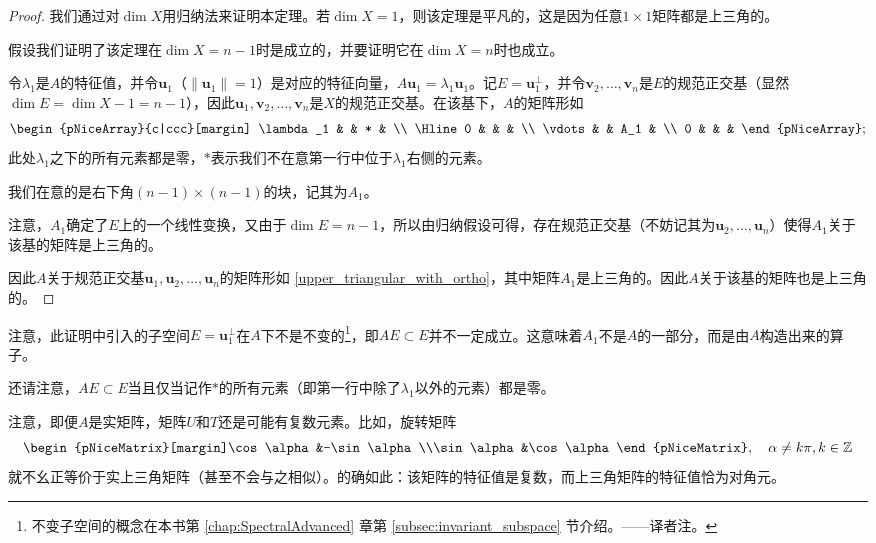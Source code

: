 \begin{proof}
    我们通过对$\dim X$用归纳法来证明本定理。若$\dim X=1$，则该定理是平凡的，这是因为任意$1\times 1$矩阵都是上三角的。

    假设我们证明了该定理在$\dim X=n-1$时是成立的，并要证明它在$\dim X=n$时也成立。

    令$\lambda_1$是$A$的特征值，并令$\mathbf{u}_1$（$\|\mathbf{u}_1\|=1$）是对应的特征向量，$A\mathbf{u}_1=\lambda_1\mathbf{u}_1$。记$E=\mathbf{u}_1^\perp$，并令$\mathbf{v}_{2},\ldots,\mathbf{v}_{n}$是$E$的规范正交基（显然$\dim E=\dim X-1=n-1$），因此$\mathbf{u}_1,\mathbf{v}_{2},\ldots,\mathbf{v}_{n}$是$X$的规范正交基。在该基下，$A$的矩阵形如
    \begin{equation}\label{upper_triangular_with_ortho}
        \begin{pNiceArray}{c|ccc}[margin]
            \lambda_1 & & * & \\
            \Hline
            0 & & & \\
            \vdots & & A_1 & \\
            0 & & & 
        \end{pNiceArray};
    \end{equation}
    此处$\lambda_1$之下的所有元素都是零，$\ast$表示我们不在意第一行中位于$\lambda_1$右侧的元素。

    我们在意的是右下角$(n-1)\times (n-1)$的块，记其为$A_1$。

    注意，$A_1$确定了$E$上的一个线性变换，又由于$\dim E=n-1$，所以由归纳假设可得，存在规范正交基（不妨记其为$\mathbf{u}_{2},\ldots,\mathbf{u}_{n}$）使得$A_1$关于该基的矩阵是上三角的。

    因此$A$关于规范正交基$\mathbf{u}_{1},\mathbf{u}_{2},\ldots,\mathbf{u}_{n}$的矩阵形如 \eqref{upper_triangular_with_ortho}，其中矩阵$A_1$是上三角的。因此$A$关于该基的矩阵也是上三角的。
\end{proof}

\begin{remark*}
    注意，此证明中引入的子空间$E=\mathbf{u}_1^\perp$在$A$下不是不变的\footnote{不变子空间的概念在本书第 \ref{chap:SpectralAdvanced} 章第 \ref{subsec:invariant_subspace} 节介绍。——译者注。}，即$AE\subset E$并不一定成立。这意味着$A_1$不是$A$的一部分，而是由$A$构造出来的算子。

    还请注意，$AE\subset E$当且仅当记作$\ast$的所有元素（即第一行中除了$\lambda_1$以外的元素）都是零。
\end{remark*}

\begin{remark*}
    注意，即便$A$是实矩阵，矩阵$U$和$T$还是可能有复数元素。比如，旋转矩阵
    \[\begin{pNiceMatrix}[margin]\cos\alpha&-\sin\alpha\\\sin\alpha&\cos\alpha\end{pNiceMatrix},\quad\alpha\neq k\pi,k\in\mathbb{Z}\]
    就不幺正等价于实上三角矩阵（甚至不会与之相似）。的确如此：该矩阵的特征值是复数，而上三角矩阵的特征值恰为对角元。
\end{remark*}

